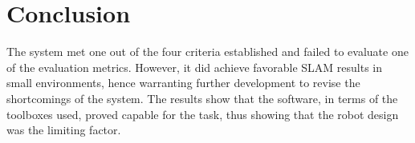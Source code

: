 \section{Conclusion}

The system met one out of the four criteria established and failed to evaluate one of the evaluation metrics. However, it did achieve favorable SLAM results in small environments, hence warranting further development to revise the shortcomings of the system. The results show that the software, in terms of the toolboxes used, proved capable for the task, thus showing that the robot design was the limiting factor.



\begin{comment}
    
\end{comment}
